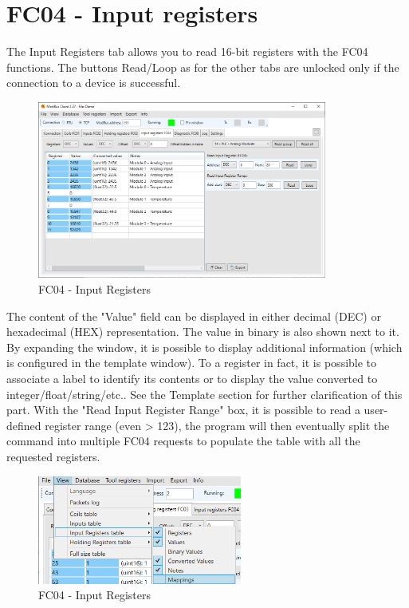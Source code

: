 \newpage
\section{FC04 - Input registers}

The Input Registers tab allows you to read 16-bit registers with the FC04 functions. The buttons
Read/Loop as for the other tabs are unlocked only if the connection to a device is
successful.

\begin{figure}[H]
\centering
\includegraphics[width=0.85\textwidth]{../Img/Modbus_Client_InputReg_00.PNG}
\caption{FC04 - Input Registers}
\end{figure}

The content of the "Value" field can be displayed in either decimal (DEC) or hexadecimal
(HEX) representation. The value in binary is also shown next to it. By expanding the window, it is possible to
display additional information (which is configured in the template window). To a
register in fact, it is possible to associate a label to identify its contents or to display the value
converted to integer/float/string/etc.. See the Template section for further clarification of this part.
With the "Read Input Register Range" box, it is possible to read a user-defined register range
(even > 123), the program will then eventually split the command into multiple FC04 requests
to populate the table with all the requested registers.

\begin{figure}[H]
\centering
\includegraphics[width=0.60\textwidth]{../Img/Menu_View_InputReg.PNG}
\caption{FC04 - Input Registers}
\end{figure}

